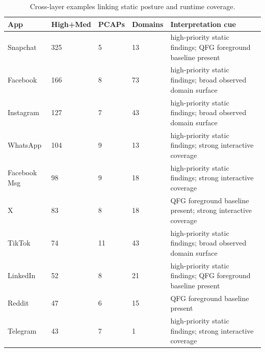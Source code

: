 \begin{table}[t]
\centering
\caption{Cross-layer examples linking static posture and runtime coverage.}
\label{tab:cross_layer}
\small
\begin{tabular}{lllll}
\hline
App & High+Med & PCAPs & Domains & Interpretation cue \\
\hline
Snapchat & 325 & 5 & 13 & high-priority static findings; QFG foreground baseline present \\
Facebook & 166 & 8 & 73 & high-priority static findings; broad observed domain surface \\
Instagram & 127 & 7 & 43 & high-priority static findings; broad observed domain surface \\
WhatsApp & 104 & 9 & 13 & high-priority static findings; strong interactive coverage \\
Facebook Msg & 98 & 9 & 18 & high-priority static findings; strong interactive coverage \\
X & 83 & 8 & 18 & QFG foreground baseline present; strong interactive coverage \\
TikTok & 74 & 11 & 43 & high-priority static findings; broad observed domain surface \\
LinkedIn & 52 & 8 & 21 & high-priority static findings; QFG foreground baseline present \\
Reddit & 47 & 6 & 15 & QFG foreground baseline present \\
Telegram & 43 & 7 & 1 & high-priority static findings; strong interactive coverage \\
\hline
\end{tabular}
\end{table}
